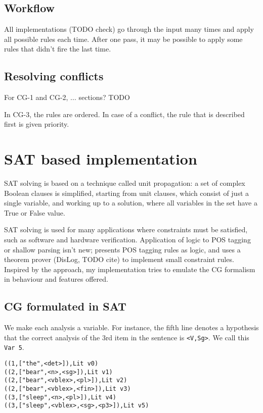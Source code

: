 \documentclass[a4paper, 11pt]{article}
\begin{document}
\subsection{Workflow}

All implementations (TODO check) go through the input many times and apply all possible rules each time. 
After one pass, it may be possible to apply some rules that didn't fire the last time.


\subsection{Resolving conflicts}

For CG-1 and CG-2, ... sections? TODO

In CG-3, the rules are ordered. In case of a conflict, the rule that is described first is given priority.


\section{SAT based implementation}

SAT solving is based on a technique called unit propagation:
a set of complex Boolean clauses is simplified, starting from unit
clauses, which consist of just a single variable, and working up to a
solution, where all variables in the set have a True or False value.

SAT solving is used for many applications where constraints must be
satisfied, such as software and hardware verification.
Application of logic to POS tagging or shallow parsing isn't new;
\cite{lager1998, lager2000} presents POS tagging rules as logic, and uses
a theorem prover (DisLog, TODO cite) to implement small constraint rules.
Inspired by the approach, my implementation tries to emulate the CG
formalism in behaviour and features offered.



\subsection{CG formulated in SAT}

We make each analysis a variable. For instance, the fifth line denotes
a hypothesis that the correct analysis of the 3rd item in the sentence
is \texttt{<V,Sg>}. We call this \texttt{Var 5}.

\begin{lstlisting}
((1,["the",<det>]),Lit v0)
((2,["bear",<n>,<sg>]),Lit v1)
((2,["bear",<vblex>,<pl>]),Lit v2)
((2,["bear",<vblex>,<fin>]),Lit v3)
((3,["sleep",<n>,<pl>]),Lit v4)
((3,["sleep",<vblex>,<sg>,<p3>]),Lit v5)
\end{lstlisting}
\end{document}
